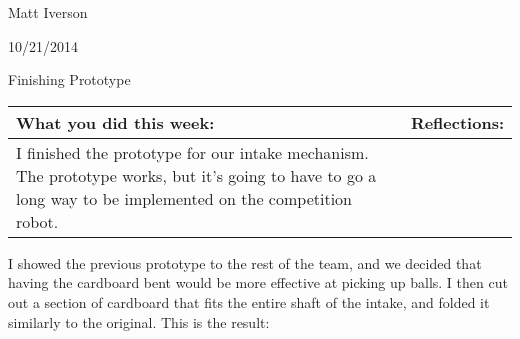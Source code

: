 Matt Iverson

10/21/2014

Finishing Prototype

\begin{tabular}{|p{5cm}|p{5cm}|}
 \hline
 What you did this week: &
 Reflections: \\
 \hline
 I finished the prototype for our intake mechanism.
 The prototype works, but it’s going to have to go a long way to be implemented on the competition robot.\\
 \hline
\end{tabular}

I showed the previous prototype to the rest of the team, and we decided that having the cardboard bent would be more effective at picking up balls. I then cut out a section of cardboard that fits the entire shaft of the intake, and folded it similarly to the original. This is the result: 


